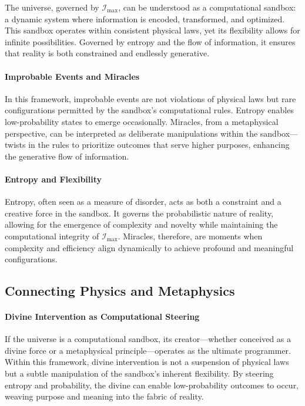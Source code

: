 \documentclass[12pt]{article}
\begin{document}
The universe, governed by \(\mathcal{I}_{\text{max}}\), can be understood as a computational sandbox: a dynamic system where information is encoded, transformed, and optimized. This sandbox operates within consistent physical laws, yet its flexibility allows for infinite possibilities. Governed by entropy and the flow of information, it ensures that reality is both constrained and endlessly generative.

\paragraph{Improbable Events and Miracles}
In this framework, improbable events are not violations of physical laws but rare configurations permitted by the sandbox’s computational rules. Entropy enables low-probability states to emerge occasionally. Miracles, from a metaphysical perspective, can be interpreted as deliberate manipulations within the sandbox—twists in the rules to prioritize outcomes that serve higher purposes, enhancing the generative flow of information.

\paragraph{Entropy and Flexibility}
Entropy, often seen as a measure of disorder, acts as both a constraint and a creative force in the sandbox. It governs the probabilistic nature of reality, allowing for the emergence of complexity and novelty while maintaining the computational integrity of \(\mathcal{I}_{\text{max}}\). Miracles, therefore, are moments when complexity and efficiency align dynamically to achieve profound and meaningful configurations.

\subsection{Connecting Physics and Metaphysics}

\paragraph{Divine Intervention as Computational Steering}
If the universe is a computational sandbox, its creator—whether conceived as a divine force or a metaphysical principle—operates as the ultimate programmer. Within this framework, divine intervention is not a suspension of physical laws but a subtle manipulation of the sandbox’s inherent flexibility. By steering entropy and probability, the divine can enable low-probability outcomes to occur, weaving purpose and meaning into the fabric of reality.
\end{document}
